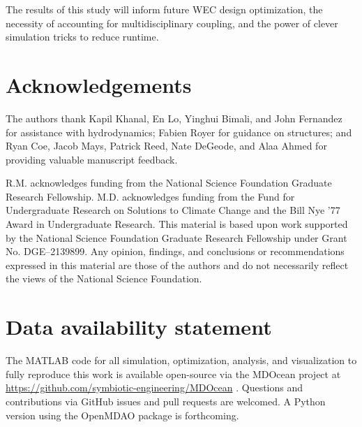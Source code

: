 \documentclass[preprint,12pt]{elsarticle}
\begin{document}
The results of this study will inform future WEC design optimization, the necessity of accounting for multidisciplinary coupling, and the power of clever simulation tricks to reduce runtime.

\section{Acknowledgements}
The authors thank Kapil Khanal, En Lo, Yinghui Bimali, and John Fernandez for assistance with hydrodynamics; Fabien Royer for guidance on structures; and Ryan Coe, Jacob Mays, Patrick Reed, Nate DeGeode, and Alaa Ahmed for providing valuable manuscript feedback.

R.M. acknowledges funding from the National Science Foundation Graduate Research Fellowship.
M.D. acknowledges funding from the Fund for Undergraduate Research on Solutions to Climate Change and the Bill Nye ’77 Award in Undergraduate Research.
This material is based upon work supported by the National Science Foundation Graduate Research Fellowship under Grant No.
DGE–2139899.
Any opinion, findings, and conclusions or recommendations expressed in this material are those of the authors and do not necessarily reflect the views of the National Science Foundation.

\section{Data availability statement}
The MATLAB code for all simulation, optimization, analysis, and visualization to fully reproduce this work is available open-source via the MDOcean project at \url{https://github.com/symbiotic-engineering/MDOcean} \cite{mccabe_mdocean_2024}.
Questions and contributions via GitHub issues and pull requests are welcomed.
A Python version using the OpenMDAO package is forthcoming. %





\end{document}

